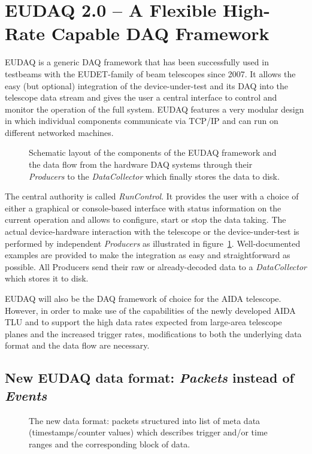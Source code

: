 \documentclass[paper=a4, fontsize=11pt, titlepage]{scrartcl}	%
\numberwithin{equation}{section}		%
\numberwithin{figure}{section}			%
\numberwithin{table}{section}           	%
\begin{document}
\section{EUDAQ 2.0 -- A Flexible High-Rate Capable DAQ Framework}

EUDAQ is a generic DAQ framework that has been successfully used in
testbeams with the EUDET-family of beam telescopes since 2007.  It
allows the easy (but optional) integration of the device-under-test
and its DAQ into the telescope data stream and gives the user a
central interface to control and monitor the operation of the full
system. EUDAQ features a very modular design in which individual
components communicate via TCP/IP and can run on different networked
machines.

\begin{figure}[htbp]
  \centering
  
  \caption{Schematic layout of the components of the EUDAQ framework
    and the data flow from the hardware DAQ systems through their
    \emph{Producers} to the \emph{DataCollector} which finally stores the data
    to disk.
  }
\label{fig:layout_eudaq1}
\end{figure}

The central authority is called \emph{RunControl}. It provides the
user with a choice of either a graphical or console-based interface
with status information on the current operation and allows to
configure, start or stop the data taking. The actual device-hardware
interaction with the telescope or the device-under-test is performed
by independent \emph{Producers} as illustrated in
figure~\ref{fig:layout_eudaq1}. Well-documented examples are provided
to make the integration as easy and straightforward as possible. All
Producers send their raw or already-decoded data to a
\emph{DataCollector} which stores it to disk.

EUDAQ will also be the DAQ framework of choice for the AIDA
telescope. However, in order to make use of the capabilities of the
newly developed AIDA TLU and to support the high data rates expected
from large-area telescope planes and the increased trigger rates,
modifications to both the underlying data format and the data flow are
necessary.


\subsection{New EUDAQ data format: \emph{Packets} instead of \emph{Events}}
\label{sec:event}

\begin{figure}[htbp]
  \centering
  
  \caption{The new data format: packets structured into list of meta
    data (timestamps/counter values) which describes trigger and/or
    time ranges and the corresponding block of data.}
\label{fig:packetformat}
\end{figure}
\end{document}
